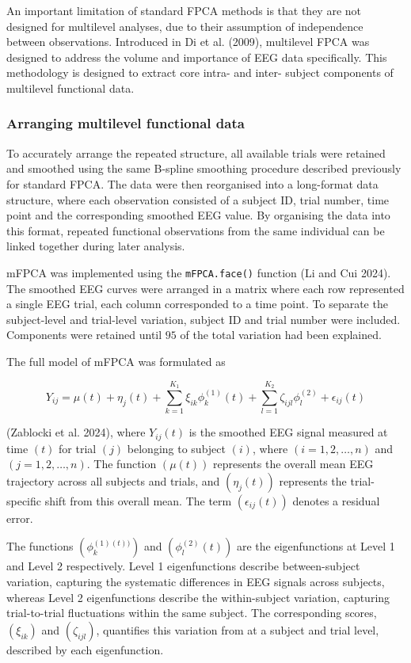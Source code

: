 \documentclass{article}
\begin{document}
An important limitation of standard FPCA methods is that they are not
designed for multilevel analyses, due to their assumption of
independence between observations. Introduced in Di et al. (2009),
multilevel FPCA was designed to address the volume and importance of EEG
data specifically. This methodology is designed to extract core intra-
and inter- subject components of multilevel functional data.

\subsubsection{Arranging multilevel functional
data}\label{arranging-multilevel-functional-data}

To accurately arrange the repeated structure, all available trials were
retained and smoothed using the same B-spline smoothing procedure
described previously for standard FPCA. The data were then reorganised
into a long-format data structure, where each observation consisted of a
subject ID, trial number, time point and the corresponding smoothed EEG
value. By organising the data into this format, repeated functional
observations from the same individual can be linked together during
later analysis.

mFPCA was implemented using the \texttt{mFPCA.face()} function (Li and
Cui 2024). The smoothed EEG curves were arranged in a matrix where each
row represented a single EEG trial, each column corresponded to a time
point. To separate the subject-level and trial-level variation, subject
ID and trial number were included. Components were retained until \(95%
\) of the total variation had been explained.

The full model of mFPCA was formulated as

\[Y_{ij} = \mu(t) + \eta_j(t) + \sum^{K_1}_{k=1} \xi_{ik}\phi_k^{(1)}(t) + \sum^{K_2}_{l=1} \zeta_{ijl}\phi_l^{(2)} + \epsilon_{ij}(t)\]

({Zablocki et al.} 2024), where \(Y_{ij}(t)\) is the smoothed EEG signal
measured at time \((t)\) for trial \((j)\) belonging to subject \((i)\),
where \((i = 1, 2, \ldots, n)\) and \((j = 1, 2, \ldots, n)\). The
function \((\mu(t))\) represents the overall mean EEG trajectory across
all subjects and trials, and \((\eta_j(t))\) represents the
trial-specific shift from this overall mean. The term
\((\epsilon_{ij}(t))\) denotes a residual error.

The functions \((\phi_k^{(1)(t))})\) and \((\phi_l^{(2)}(t))\) are the
eigenfunctions at Level 1 and Level 2 respectively. Level 1
eigenfunctions describe between-subject variation, capturing the
systematic differences in EEG signals across subjects, whereas Level 2
eigenfunctions describe the within-subject variation, capturing
trial-to-trial fluctuations within the same subject. The corresponding
scores, \((\xi_{ik})\) and \((\zeta_{ijl})\), quantifies this variation
from at a subject and trial level, described by each eigenfunction.
\end{document}
